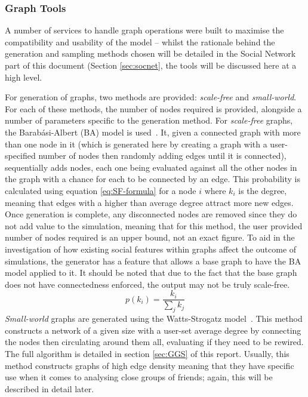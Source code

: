 \documentclass[]{report}
\begin{document}
\subsubsection{Graph Tools}
A number of services to handle graph operations were built to maximise the compatibility and usability of the model – whilst the rationale behind the generation and sampling methods chosen will be detailed in the Social Network part of this document (Section \ref{sec:socnet}, the tools will be discussed here at a high level.

For generation of graphs, two methods are provided: \emph{scale-free} and \emph{small-world}. For each of these methods, the number of nodes required is provided, alongside a number of parameters specific to the generation method. For \emph{scale-free} graphs, the Barab\'{a}si-Albert (BA) model is used~\cite{BAStat}. It, given a connected graph with more than one node in it (which is generated here by creating a graph with a user-specified number of nodes then randomly adding edges until it is connected), sequentially adds nodes, each one being evaluated against all the other nodes in the graph with a chance for each to be connected by an edge. This probability is calculated using equation \ref{eq:SF-formula} for a node $i$ where $k_{i}$ is the degree, meaning that edges with a higher than average degree attract more new edges. Once generation is complete, any disconnected nodes are removed since they do not add value to the simulation, meaning that for this method, the user provided number of nodes required is an upper bound, not an exact figure. To aid in the investigation of how existing social features within graphs affect the outcome of simulations, the generator has a feature that allows a base graph to have the BA model applied to it. It should be noted that due to the fact that the base graph does not have connectedness enforced, the output may not be truly scale-free. 
\begin{equation}
p(k_{i}) = \frac{k_{i}}{\sum\limits_{j}k_{j}}
\label{eq:SF-formula}
\end{equation}
\emph{Small-world} graphs are generated using the Watts-Strogatz model~\cite{BAStat}. This method constructs a network of a given size with a user-set average degree by connecting the nodes then circulating around them all, evaluating if they need to be rewired. The full algorithm is detailed in section \ref{sec:GGS} of this report. Usually, this method constructs graphs of high edge density meaning that they have specific use when it comes to analysing close groups of friends; again, this will be described in detail later.
\end{document}
